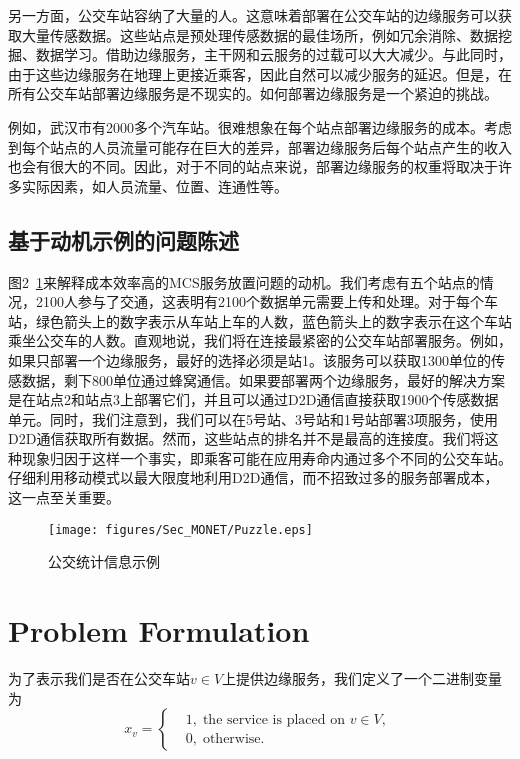 另一方面，公交车站容纳了大量的人。这意味着部署在公交车站的边缘服务可以获取大量传感数据。这些站点是预处理传感数据的最佳场所，例如冗余消除、数据挖掘、数据学习。借助边缘服务，主干网和云服务的过载可以大大减少。与此同时，由于这些边缘服务在地理上更接近乘客，因此自然可以减少服务的延迟。但是，在所有公交车站部署边缘服务是不现实的。如何部署边缘服务是一个紧迫的挑战。


例如，武汉市有2000多个汽车站。很难想象在每个站点部署边缘服务的成本。考虑到每个站点的人员流量可能存在巨大的差异，部署边缘服务后每个站点产生的收入也会有很大的不同。因此，对于不同的站点来说，部署边缘服务的权重将取决于许多实际因素，如人员流量、位置、连通性等。

\subsection{基于动机示例的问题陈述}

图2~\ref{Figure_puzzle}来解释成本效率高的MCS服务放置问题的动机。我们考虑有五个站点的情况，2100人参与了交通，这表明有2100个数据单元需要上传和处理。对于每个车站，绿色箭头上的数字表示从车站上车的人数，蓝色箭头上的数字表示在这个车站乘坐公交车的人数。直观地说，我们将在连接最紧密的公交车站部署服务。例如，如果只部署一个边缘服务，最好的选择必须是站1。该服务可以获取1300单位的传感数据，剩下800单位通过蜂窝通信。如果要部署两个边缘服务，最好的解决方案是在站点2和站点3上部署它们，并且可以通过D2D通信直接获取1900个传感数据单元。同时，我们注意到，我们可以在5号站、3号站和1号站部署3项服务，使用D2D通信获取所有数据。然而，这些站点的排名并不是最高的连接度。我们将这种现象归因于这样一个事实，即乘客可能在应用寿命内通过多个不同的公交车站。仔细利用移动模式以最大限度地利用D2D通信，而不招致过多的服务部署成本，这一点至关重要。

\begin{figure}[!h]
\centering
\texttt{[image: figures/Sec\_MONET/Puzzle.eps]}
\caption{公交统计信息示例}
\label{Figure_puzzle}
\end{figure}

\section{Problem Formulation}

为了表示我们是否在公交车站$v\in V$上提供边缘服务，我们定义了一个二进制变量为
\[
x_v =\left\{
\begin{aligned}
&1, \; \text{the service is placed on $v\in V$, }\\
&0, \; \text{otherwise}.
\end{aligned}
\right.
\]

